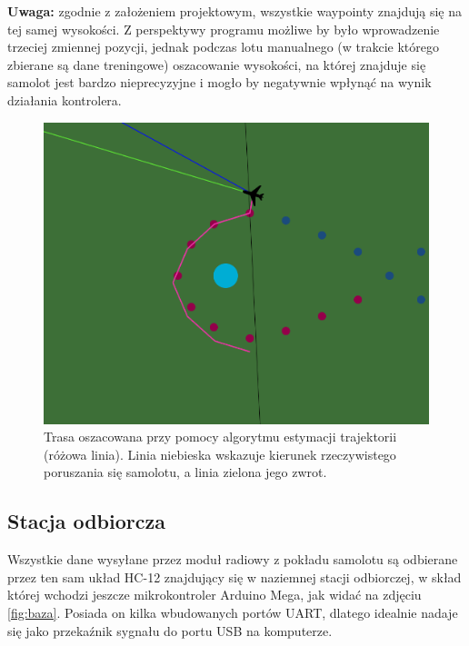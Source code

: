 \documentclass[12pt, a4paper]{article}
\begin{document}
\textbf{Uwaga:} zgodnie z założeniem projektowym, wszystkie waypointy znajdują się na tej samej wysokości. Z perspektywy programu możliwe by było wprowadzenie trzeciej zmiennej pozycji, jednak podczas lotu manualnego (w trakcie którego zbierane są dane treningowe) oszacowanie wysokości, na której znajduje się samolot jest bardzo nieprecyzyjne i mogło by negatywnie wpłynąć na wynik działania kontrolera.

\begin{figure}[ht]
    \centering
    \includegraphics[width=1\textwidth]{estymacja}
    \caption{Trasa oszacowana przy pomocy algorytmu estymacji trajektorii (różowa linia). Linia niebieska wskazuje kierunek rzeczywistego poruszania się samolotu, a linia zielona jego zwrot.}
    \label{fig:estymacja}
\end{figure}

 \FloatBarrier
\subsection{Stacja odbiorcza}
Wszystkie dane wysyłane przez moduł radiowy z pokładu samolotu są odbierane przez ten sam układ HC-12 znajdujący się w naziemnej stacji odbiorczej, w skład której wchodzi jeszcze mikrokontroler Arduino Mega, jak widać na zdjęciu \ref{fig:baza}. Posiada on kilka wbudowanych portów UART, dlatego idealnie nadaje się jako przekaźnik sygnału do portu USB na komputerze.
\end{document}

